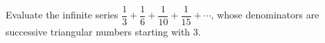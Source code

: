 Evaluate the infinite series $\dfrac{1}{3}+\dfrac{1}{6}+\dfrac{1}{10}+\dfrac{1}{15}+\cdots$, whose denominators are successive triangular numbers starting with $3$.
